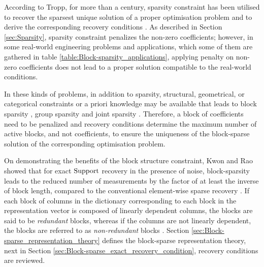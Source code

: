 According to Tropp, for more than a century, sparsity constraint has been utilised to recover the sparsest unique solution of a proper optimisation problem and to derive the corresponding recovery conditions \cite{Tropp2004b}.
As described in Section \ref{sec:Sparsity}, sparsity constraint penalizes the non-zero coefficients; 
however, in some real-world engineering problems and applications, which some of them are gathered in table \ref{table:Block-sparsity_applications}, applying penalty on non-zero coefficients does not lead to a proper solution compatible to the real-world conditions.


In these kinds of problems, in addition to sparsity, structural, geometrical, or categorical constraints or a priori knowledge may be available that leads to block sparsity \cite{Eldar2010}, 
group sparsity \cite{Rao2012a} and joint sparsity \cite{Fornasier2008}.
Therefore, a block of coefficients need to be penalized and recovery conditions determine the maximum number of active blocks, and not coefficients, to ensure the uniqueness of the block-sparse solution of the corresponding optimisation problem.

On demonstrating the benefits of the block structure constraint, Kwon and Rao showed that for exact $\mathrm{Support}$ recovery in the presence of noise, block-sparsity leads to the reduced number of measurements by the factor of at least the inverse of block length, compared to the conventional element-wise sparse recovery \cite{Kwon2012}.
If each block of columns in the dictionary corresponding to each block in the representation vector is composed of linearly dependent columns, the blocks are said to be \emph{redundant} blocks, whereas if the columns are not linearly dependent, the blocks are referred to as \emph{non-redundant} blocks \cite{Elhamifar2012b}.
Section \ref{sec:Block-sparse_representation_theory} defines the block-sparse representation theory, next in Section \ref{sec:Block-sparse_exact_recovery_condition}, recovery conditions are reviewed.
